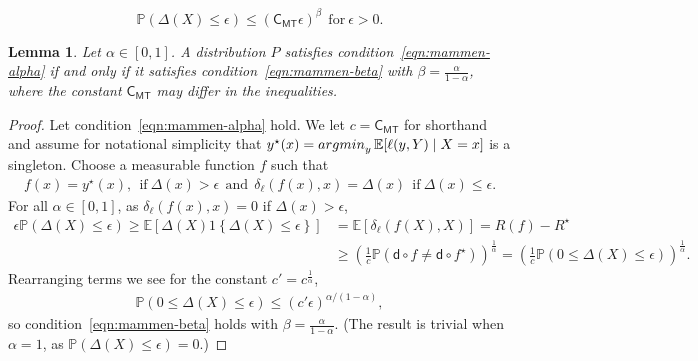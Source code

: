 \documentclass[10pt,a4paper]{amsart}
\newtheorem{lemma}{Lemma}
\newcommand{\E}{\mathbb{E}} %
\renewcommand{\P}{\mathbb{P}} %
\providecommand{\argmin}{\mathop{\rm argmin}}
\newcommand{\constant}{\mathsf{C}}  %
\newcommand{\cstMT}{\constant_{\mathsf{MT}}}
\newcommand{\extloss}{\delta_\tloss}
\newcommand{\indic}[1]{1\!\left\{#1\right\}} %
\newcommand{\opt}{^\star} %
\newcommand{\pred}{\mathsf{d}}  %
\newcommand{\prn}[1]{\left({#1}\right)} %
\newcommand{\tloss}{\ell}  %
\begin{document}
\begin{equation}
  \label{eqn:mammen-beta}
  \P(\Delta(X) \leq \epsilon) \leq (\cstMT  \epsilon)^\beta
  ~~ \mbox{for} ~\epsilon > 0.  
  \tag{M$_\beta$}
\end{equation}

\begin{lemma}
  Let $\alpha \in [0, 1]$.
  A distribution $P$ satisfies condition~\eqref{eqn:mammen-alpha}
  if and only if it satisfies condition~\eqref{eqn:mammen-beta}
  with $\beta = \frac{\alpha}{1- \alpha}$,
  where the constant $\cstMT$ may differ in the inequalities.
\end{lemma}

\begin{proof}
  Let condition~\eqref{eqn:mammen-alpha} hold.
  We let $c = \cstMT$ for shorthand and
  assume for notational
  simplicity that $y\opt(x) = \argmin_y \E[\tloss(y, Y) \mid X = x]$ is a
  singleton.
  Choose a measurable
  function $f$ such that
  \begin{align*}
    f(x) = y\opt(x), ~~\mbox{if} ~ \Delta(x) > \epsilon
    ~~ \mbox{and} ~~
    \extloss(f(x),x) = \Delta(x)
    ~~ \mbox{if}~ \Delta(x) \leq \epsilon.
  \end{align*}
  For all $\alpha \in [0,1]$, as $\extloss(f(x), x) = 0$
  if $\Delta(x) > \epsilon$,
  \begin{align*}
    \epsilon \P(\Delta(X) \leq \epsilon)
    \geq
    \E[\Delta(X) \indic{\Delta(X) \leq \epsilon}]
    & = \E\left[\extloss(f(X),X)\right]
    = R(f) - R\opt \\
    & \geq \prn{\frac{1}{c}
      \P(\pred \circ f \neq \pred \circ f\opt)}^{\frac{1}{\alpha}}
    = \prn{\frac{1}{c} \P(0 \leq \Delta(X) \leq \epsilon)}^{\frac{1}{\alpha}}.
  \end{align*}
  Rearranging terms we see for the constant $c' = c^{\frac{1}{\alpha}}$,
  \begin{align*}
    \mathbb{P}(0 \leq \Delta(X) \leq \epsilon) \leq
    (c' \epsilon)^{\alpha/(1-\alpha)},
  \end{align*}
  so condition~\eqref{eqn:mammen-beta} holds with $\beta = \frac{\alpha}{1 -
    \alpha}$.
  (The result is trivial when $\alpha = 1$, as
  $\P(\Delta(X) \le \epsilon) = 0$.)


\end{proof}
\end{document}
